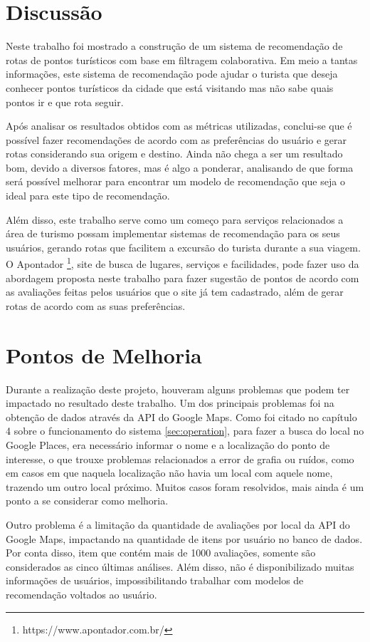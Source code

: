 \section{Discussão}

Neste trabalho foi mostrado a construção de um sistema de recomendação de rotas de pontos turísticos com base em filtragem colaborativa. Em meio a tantas informações, este sistema de recomendação pode ajudar o turista que deseja conhecer pontos turísticos da cidade que está visitando mas não sabe quais pontos ir e que rota seguir.

Após analisar os resultados obtidos com as métricas utilizadas,  conclui-se que é possível fazer recomendações de acordo com as preferências do usuário e gerar rotas considerando sua origem e destino. Ainda não chega a ser um resultado bom, devido a diversos fatores, mas é algo a ponderar, analisando de que forma será possível melhorar para encontrar um modelo de recomendação que seja o ideal para este tipo de recomendação.

Além disso, este trabalho serve como um começo para serviços relacionados a área de turismo possam implementar sistemas de recomendação para os seus usuários, gerando rotas que facilitem a excursão do turista durante a sua viagem. O Apontador \footnote{https://www.apontador.com.br/}, site de busca de lugares, serviços e facilidades, pode fazer uso da abordagem proposta neste trabalho para fazer sugestão de pontos de acordo com as avaliações feitas pelos usuários que o site já tem cadastrado, além de gerar rotas de acordo com as suas preferências.

\section{Pontos de Melhoria}

Durante a realização deste projeto, houveram alguns problemas que podem ter impactado no resultado deste trabalho. Um dos principais problemas foi na obtenção de dados através da API do Google Maps. Como foi citado no capítulo 4 sobre o funcionamento do sistema \ref{sec:operation}, para fazer a busca do local no Google Places, era necessário informar o nome e a localização do ponto de interesse, o que trouxe problemas relacionados a error de grafia ou ruídos, como em casos em que naquela localização não havia um local com aquele nome, trazendo um outro local próximo. Muitos casos foram resolvidos, mais ainda é um ponto a se considerar como melhoria.

Outro problema é a limitação da quantidade de avaliações por local da API do Google Maps, impactando na quantidade de itens por usuário no banco de dados. Por conta disso, item que contém mais de 1000 avaliações, somente são considerados as cinco últimas análises. Além disso, não é disponibilizado muitas informações de usuários, impossibilitando trabalhar com modelos de recomendação voltados ao usuário.

